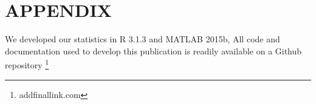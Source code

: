 \section{APPENDIX}

We developed our statistics in R 3.1.3 \cite{rCoreCitation} and MATLAB 2015b, All code and documentation used to develop this publication is readily available on a Github repository \footnote{addfinallink.com}
